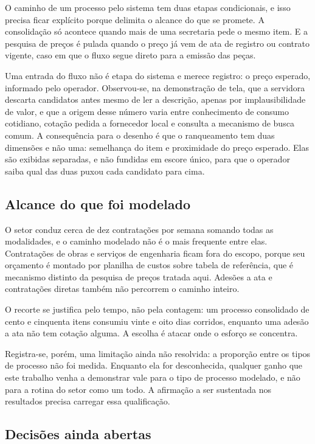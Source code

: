 O caminho de um processo pelo sistema tem duas etapas condicionais, e isso
precisa ficar explícito porque delimita o alcance do que se promete. A
consolidação só acontece quando mais de uma secretaria pede o mesmo item. E a
pesquisa de preços é pulada quando o preço já vem de ata de registro ou contrato
vigente, caso em que o fluxo segue direto para a emissão das peças.

Uma entrada do fluxo não é etapa do sistema e merece registro: o preço esperado,
informado pelo operador. Observou-se, na demonstração de tela, que a servidora
descarta candidatos antes mesmo de ler a descrição, apenas por implausibilidade
de valor, e que a origem desse número varia entre conhecimento de consumo
cotidiano, cotação pedida a fornecedor local e consulta a mecanismo de busca
comum. A consequência para o desenho é que o ranqueamento tem duas dimensões e
não uma: semelhança do item e proximidade do preço esperado. Elas são exibidas
separadas, e não fundidas em escore único, para que o operador saiba qual das
duas puxou cada candidato para cima.

\subsection{Alcance do que foi modelado}
\label{subsec:alcance}

O setor conduz cerca de dez contratações por semana somando todas as
modalidades, e o caminho modelado não é o mais frequente entre elas. Contratações
de obras e serviços de engenharia ficam fora do escopo, porque seu orçamento é
montado por planilha de custos sobre tabela de referência, que é mecanismo
distinto da pesquisa de preços tratada aqui. Adesões a ata e contratações diretas
também não percorrem o caminho inteiro.

O recorte se justifica pelo tempo, não pela contagem: um processo consolidado de
cento e cinquenta itens consumiu vinte e oito dias corridos, enquanto uma adesão
a ata não tem cotação alguma. A escolha é atacar onde o esforço se concentra.

Registra-se, porém, uma limitação ainda não resolvida: a proporção entre os tipos
de processo não foi medida. Enquanto ela for desconhecida, qualquer ganho que
este trabalho venha a demonstrar vale para o tipo de processo modelado, e não
para a rotina do setor como um todo. A afirmação a ser sustentada nos resultados
precisa carregar essa qualificação.

\subsection{Decisões ainda abertas}
\label{subsec:decisoes-abertas}

